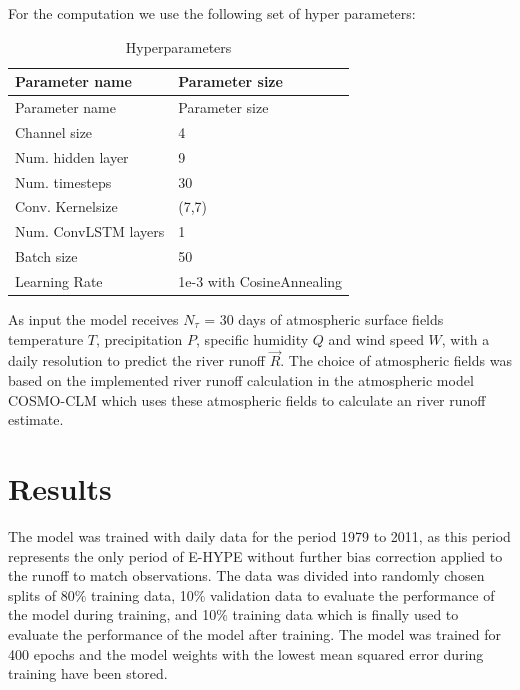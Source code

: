 \documentclass[
]{agujournal2019}
\begin{document}
For the computation we use the following set of hyper parameters:

\hypertarget{tbl-letters}{}
\begin{longtable}[]{@{}ll@{}}
\caption{\label{tbl-letters}Hyperparameters}\tabularnewline
\toprule()
Parameter name & Parameter size \\
\midrule()
\endfirsthead
\toprule()
Parameter name & Parameter size \\
\midrule()
\endhead
Channel size & 4 \\
Num. hidden layer & 9 \\
Num. timesteps & 30 \\
Conv. Kernelsize & (7,7) \\
Num. ConvLSTM layers & 1 \\
Batch size & 50 \\
Learning Rate & 1e-3 with CosineAnnealing \\
\bottomrule()
\end{longtable}

As input the model receives \(N_{\tau}\) = 30 days of atmospheric
surface fields temperature \(T\), precipitation \(P\), specific humidity
\(Q\) and wind speed \(W\), with a daily resolution to predict the river
runoff \(\vec{R}\). The choice of atmospheric fields was based on the
implemented river runoff calculation in the atmospheric model COSMO-CLM
which uses these atmospheric fields to calculate an river runoff
estimate.

\hypertarget{results}{%
\section{Results}\label{results}}

The model was trained with daily data for the period 1979 to 2011, as
this period represents the only period of E-HYPE without further bias
correction applied to the runoff to match observations. The data was
divided into randomly chosen splits of 80\(\%\) training data, 10\(\%\)
validation data to evaluate the performance of the model during
training, and 10\(\%\) training data which is finally used to evaluate
the performance of the model after training. The model was trained for
400 epochs and the model weights with the lowest mean squared error
during training have been stored.
\end{document}
